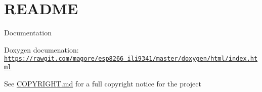 \hypertarget{index_README}{}\section{R\-E\-A\-D\-M\-E}\label{index_README}
\begin{DoxyParagraph}{Documentation}

\begin{DoxyItemize}
\item Doxygen documenation\-: \href{https://rawgit.com/magore/esp8266_ili9341/master/doxygen/html/index.html}{\tt https\-://rawgit.\-com/magore/esp8266\-\_\-ili9341/master/doxygen/html/index.\-html}
\end{DoxyItemize}
\end{DoxyParagraph}

\begin{DoxyItemize}
\item See \hyperlink{md_COPYRIGHT}{C\-O\-P\-Y\-R\-I\-G\-H\-T.md} for a full copyright notice for the project
\end{DoxyItemize}

